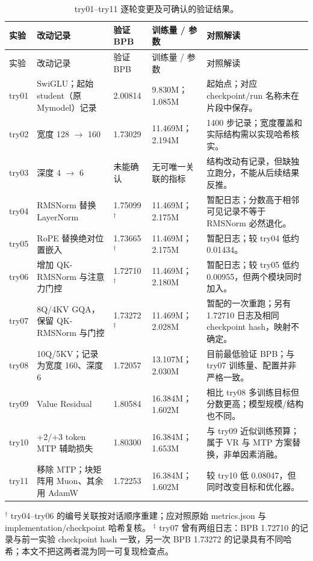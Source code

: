 \documentclass[UTF8,a4paper,11pt]{ctexart}
\begin{document}
\begin{longtable}{@{}p{}p{}p{}p{}p{}@{}}
\caption{try01--try11 逐轮变更及可确认的验证结果。}\label{tab:timeline}\\
\toprule
实验 & 改动记录 & 验证 BPB & 训练量 / 参数 & 对照解读 \\
\midrule
\endfirsthead
\toprule
实验 & 改动记录 & 验证 BPB & 训练量 / 参数 & 对照解读 \\
\midrule
\endhead
try01 & SwiGLU；起始 student（原 Mymodel）记录 & 2.00814 & 9.830M；1.085M & 起始点；对应 checkpoint/run 名称未在片段中保存。 \\
try02 & 宽度 128 $\to$ 160 & 1.73029 & 11.469M；2.194M & 1400 步记录；宽度覆盖和实际结构需以实现哈希核实。 \\
try03 & 深度 4 $\to$ 6 & 未能确认 & 无可唯一关联的指标 & 结构改动有记录，但缺独立跑分，不能从后续结果反推。 \\
try04 & RMSNorm 替换 LayerNorm & 1.75099$^\dagger$ & 11.469M；2.175M & 暂配日志；分数高于相邻可见记录不等于 RMSNorm 必然退化。 \\
try05 & RoPE 替换绝对位置嵌入 & 1.73665$^\dagger$ & 11.469M；2.175M & 暂配日志；较 try04 低约 0.01434。 \\
try06 & 增加 QK-RMSNorm 与注意力门控 & 1.72710$^\dagger$ & 11.469M；2.180M & 暂配日志；较 try05 低约 0.00955，但两个模块同时加入。 \\
try07 & 8Q/4KV GQA，保留 QK-RMSNorm 与门控 & 1.73272$^\ddagger$ & 11.469M；2.028M & 暂配的一次重跑；另有 1.72710 日志及相同 checkpoint hash，映射不确定。 \\
try08 & 10Q/5KV；记录为宽度 160、深度 6 & 1.72057 & 13.107M；2.030M & 目前最低验证 BPB；与 try07 训练量、配置并非严格一致。 \\
try09 & Value Residual & 1.80584 & 16.384M；1.602M & 相比 try08 多训练目标但分数更高；模型规模/结构也不同。 \\
try10 & +2/+3 token MTP 辅助损失 & 1.80300 & 16.384M；1.653M & 与 try09 近似训练预算；属于 VR 与 MTP 方案替换，非单因素消融。 \\
try11 & 移除 MTP；块矩阵用 Muon、其余用 AdamW & 1.72253 & 16.384M；1.602M & 较 try10 低 0.08047，但同时改变目标和优化器。 \\
\bottomrule
\end{longtable}
\noindent $^\dagger$ try04--try06 的编号关联按对话顺序重建；应对照原始 metrics.json 与 implementation/checkpoint 哈希复核。 $^\ddagger$ try07 曾有两组日志：BPB 1.72710 的记录与前一实验 checkpoint hash 一致，另一次 BPB 1.73272 的记录具有不同哈希；本文不把这两者混为同一可复现检查点。
\end{document}

